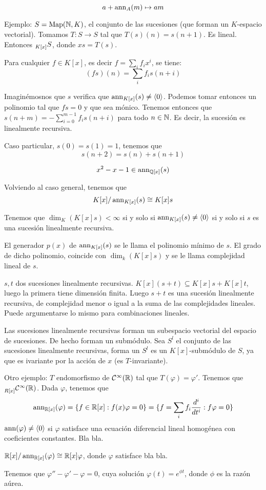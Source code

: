\[
  a+\operatorname{ann}_A(m)\mapsto am
\]

Ejemplo: \(S=\operatorname{Map}(\mathbb{N},K)\), el conjunto de las sucesiones (que forman
un \(K\)-espacio vectorial). Tomamos \(T:S\longrightarrow S\)
tal que \(T(s)(n)=s(n+1)\). Es lineal. Entonces
\(\prescript{}{K[x]}{S}\), donde \(xs=T(s)\).

Para cualquier \(f\in K[x]\), es decir \(f=\sum_i f_i x^i\), se tiene:
\[
  (fs)(n)=\sum_i f_i s(n+i)
\]

Imaginémosnos que \(s\) verifica que \(\operatorname{ann}_{K[x]}(s)\neq\langle0\rangle\).
Podemos tomar entonces un polinomio tal que \(fs = 0\) y que sea mónico.
Tenemos entonces que \(s(n+m)=-\sum_{i=0}^{m-1} f_i s(n+i)\)
para todo \(n\in\mathbb{N}\). Es decir, la sucesión es linealmente recursiva.

Caso particular, \(s(0)=s(1)=1\), tenemos que
\[
  s(n+2)=s(n)+s(n+1)
\]

\[
  x^2-x-1\in\operatorname{ann}_{\mathbb{Q}[x]}(s)
\]

Volviendo al caso general, tenemos que
\[
  K[x]/\operatorname{ann}_{K[x]}(s)\cong K[x]s
\]

Tenemos que \(\dim_{K}(K[x]s)<\infty\) si y solo si
\(\operatorname{ann}_{K[x]}(s)\neq\langle0\rangle\) si y solo si
\(s\) es una sucesión linealmente recursiva.

El generador \(p(x)\) de \(\operatorname{ann}_{K[x]}(s)\) se le llama el polinomio
mínimo de \(s\). El grado de dicho polinomio, coincide con
\(\dim_{k}(K[x]s)\) y se le llama complejidad lineal de \(s\).

\(s,t\) dos sucesiones linealmente recursivas.
\(K[x](s+t)\subseteq K[x]s+K[x]t\), luego la primera tiene dimensión finita.
Luego \(s+t\) es una sucesión linealmente recursiva, de complejidad menor
o igual a la suma de las complejidades lineales.
Puede argumentarse lo mismo para combinaciones lineales.

Las sucesiones linealmente recursivas forman un subespacio vectorial
del espacio de sucesiones. De hecho forman un submódulo. Sea
\(S^l\) el conjunto de las sucesiones linealmente recursivas, forma
un \(S^l\) es un \(K[x]\)-submódulo de \(S\), ya que es ivariante por la
acción de \(x\) (es \(T\)-invariante).

Otro ejemplo: \(T\) endomorfismo de \(\mathcal{C}^\infty(\mathbb{R})\) tal que
\(T(\varphi)=\varphi'\). Tenemos que
\(\prescript{}{R[x]}{\mathcal{C}^\infty(\mathbb{R})}\). Dada \(\varphi\),
tenemos que
\[
  \operatorname{ann}_{\mathbb{R}[x]}(\varphi)=\{f\in\mathbb{R}[x]: f(x)\varphi=0\}
  =\{f=\sum_i f_i\frac{d^i}{dt^i}: f\varphi=0\}
\]
\(\operatorname{ann}(\varphi)\neq\langle 0\rangle\) si \(\varphi\) satisface una ecuación
diferencial lineal homogénea con coeficientes constantes. Bla bla.

\(\mathbb{R}[x]/\operatorname{ann}_{\mathbb{R}[x]}(\varphi)\cong \mathbb{R}[x]\varphi\), donde \(\varphi\)
satisface bla bla.

Tenemos que \(\varphi''-\varphi'-\varphi=0\), cuya solución
\(\varphi(t)=e^{\phi t}\), donde \(\phi\) es la razón aúrea.

